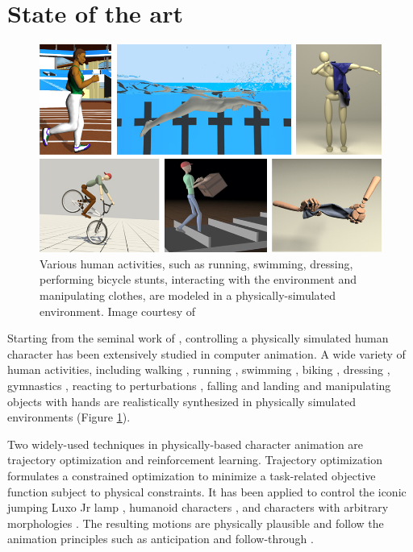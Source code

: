 \section{State of the art}

\begin{figure}[h]
  \centering
  \includegraphics[width=\textwidth]{figures/teaser2.jpg}
  \caption{Various human activities, such as running, swimming, dressing, performing bicycle stunts, interacting with the environment and manipulating clothes, are modeled in a physically-simulated environment. Image courtesy of \cite{Hodgins:1995:AHA,Si:2014,Clegg:2015,Tan:2014,Coros2010,Bai:2014}}
  \label{fig:teaser}
\end{figure}

Starting from the seminal work of \citet{Hodgins:1995:AHA}, controlling a physically simulated human character has been extensively studied in computer animation. A wide variety of human activities, including walking \cite{Yin:2007}, running \cite{Kwon:2010}, swimming \cite{kwatra2009fluid,Si:2014}, biking \cite{Tan:2014}, dressing \cite{Clegg:2015}, gymnastics \cite{Hodgins:1995:AHA}, reacting to perturbations \cite{Wang:2010}, falling and landing \cite{HA:2012:FLM} and manipulating objects with hands \cite{Liu:2009:DMF,Ye:2012,Bai:2014} are realistically synthesized in physically simulated environments (Figure \ref{fig:teaser}). 

Two widely-used techniques in physically-based character animation are trajectory optimization and reinforcement learning. Trajectory optimization formulates a constrained optimization to minimize a task-related objective function subject to physical constraints. It has been applied to control the iconic jumping Luxo Jr lamp \cite{Witkin:1988}, humanoid characters \cite{Liu:2002,Jain:2009,Ye:2010}, and characters with arbitrary morphologies \cite{Wampler:2009}. The resulting motions are physically plausible and follow the animation principles such as anticipation and follow-through \cite{thomas:1995}.

